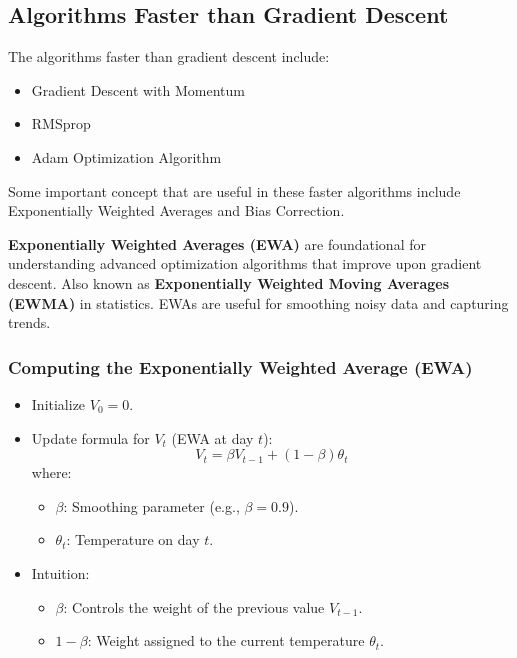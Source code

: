 \documentclass[letterpaper,12pt,notitlepage,twoside]{report}
\begin{document}
\subsection{Algorithms Faster than Gradient Descent}
The algorithms faster than gradient descent include:
\begin{itemize}[nosep]
\item Gradient Descent with Momentum
\item RMSprop
\item Adam Optimization Algorithm
\end{itemize}

Some important concept that are useful in these faster algorithms include Exponentially Weighted Averages and Bias Correction.

\textbf{Exponentially Weighted Averages (EWA)} are foundational for understanding advanced optimization algorithms that improve upon gradient descent. Also known as \textbf{Exponentially Weighted Moving Averages (EWMA)} in statistics. EWAs are useful for smoothing noisy data and capturing trends.

\subsubsection{Computing the Exponentially Weighted Average (EWA)}
\begin{itemize}
    \item Initialize \( V_0 = 0 \).
    \item Update formula for \( V_t \) (EWA at day \( t \)):
    \[
    V_t = \beta V_{t-1} + (1 - \beta)\theta_t
    \]
    where:
    \begin{itemize}
        \item \( \beta \): Smoothing parameter (e.g., \( \beta = 0.9 \)).
        \item \( \theta_t \): Temperature on day \( t \).
    \end{itemize}
    \item Intuition:
    \begin{itemize}
        \item \( \beta \): Controls the weight of the previous value \( V_{t-1} \).
        \item \( 1 - \beta \): Weight assigned to the current temperature \( \theta_t \).
    \end{itemize}
\end{itemize}
\end{document}
